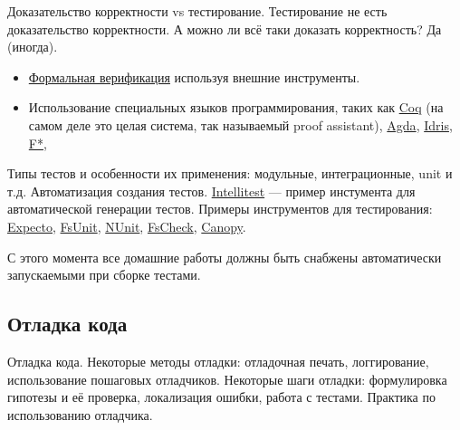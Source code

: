     Доказательство корректности vs тестирование. Тестирование не есть доказательство корректности.
    А можно ли всё таки доказать корректность? Да (иногда).
    \begin{itemize}
    	\item \href{https://en.wikipedia.org/wiki/Formal_verification#Formal_verification_for_software}{Формальная верификация} используя внешние инструменты.
        \item Использование специальных языков программирования, таких как \href{https://coq.inria.fr/}{Coq} (на самом деле это целая система, так называемый proof assistant), \href{https://wiki.portal.chalmers.se/agda/pmwiki.php}{Agda}, \href{https://www.idris-lang.org/}{Idris}, \href{https://www.fstar-lang.org/}{F*},   
    \end{itemize}

    Типы тестов и особенности их применения: модульные, интеграционные, unit и т.д. Автоматизация создания тестов. \href{https://docs.microsoft.com/en-us/visualstudio/test/intellitest-manual/?view=vs-2019}{Intellitest} --- пример инстумента для автоматической генерации тестов. Примеры инструментов для тестирования: \href{https://github.com/haf/expecto}{Expecto}, \href{http://fsprojects.github.io/FsUnit/index.html}{FsUnit}, \href{https://nunit.org/}{NUnit}, \href{https://fscheck.github.io/FsCheck/}{FsCheck}, \href{http://lefthandedgoat.github.io/canopy/}{Canopy}. 

    С этого момента все домашние работы должны быть снабжены автоматически запускаемыми при сборке тестами.


\subsection{Отладка кода}

 Отладка кода. Некоторые методы отладки: отладочная печать, логгирование, использование пошаговых отладчиков. Некоторые шаги отладки: формулировка гипотезы и её проверка, локализация ошибки, работа с тестами. Практика по использованию отладчика.
 